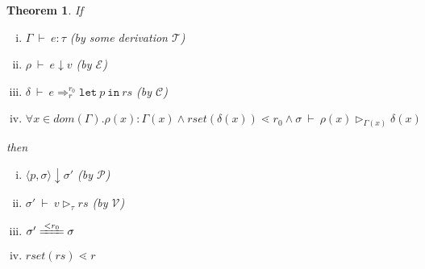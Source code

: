 \documentclass[a4paper]{article}
\newtheorem{thm}[equation]{Theorem}
\def\Eva{\downarrow}
\def\Ra{\Rightarrow}
\def\Env{\ \vdash\ }
\def\Sgm{\sigma}
\def\MC{\mathcal{C}}
\def\ME{\mathcal{E}}
\def\MP{\mathcal{P}}
\def\MT{\mathcal{T}}
\def\MV{\mathcal{V}}
\def\Eval#1#2#3{#1 \Env #2 \Eva #3 }
\def\TaSem#1#2#3{\langle #1,#2 \rangle \Eva #3}
\def\Talet#1#2{\mathtt{let} \ #1 \ \mathtt{in} \ #2}
\def\Trans#1#2#3#4#5{#1 \Env #2 \Ra^{#4}_{#5} #3}
\def\Type#1#2#3{#1 \Env #2 : #3 }
\def\ValRep#1#2#3#4{#1 \Env #2 \triangleright_{#4} #3}
\def\ConEq#1{\xlongequal{<#1}}  %
\def\SetLe{\lessdot} %
\begin{document}
\begin{thm}
	If 
	\begin{enumerate}[(i)]
		\item $\Type{\Gamma}{e}{\tau}$ (by some derivation $\MT$)
		\item $\Eval{\rho}{e}{v}$ (by $\ME$) 
		\item $\Trans{\delta}{e}{\Talet{p}{rs}}{r_0}{r}$ (by $\MC$)
		\item $\forall x \in dom(\Gamma).\rho(x):\Gamma(x) \wedge rset(\delta(x)) \SetLe r_0  \wedge  \ValRep{\Sgm}{\rho(x)}{\delta(x)}{\Gamma(x)}$
	\end{enumerate}
	then 
	\begin{enumerate}[(i)]
		\item $\TaSem{p}{\Sgm}{\Sgm'}$ (by $\MP$)
		\item  $\ValRep{\Sgm'}{v}{rs}{\tau}$ (by $\MV$)
		\item $\Sgm' \ConEq{r_0} \Sgm $
		\item  $rset(rs) \SetLe r$
	\end{enumerate} 
\end{thm}
\end{document}
